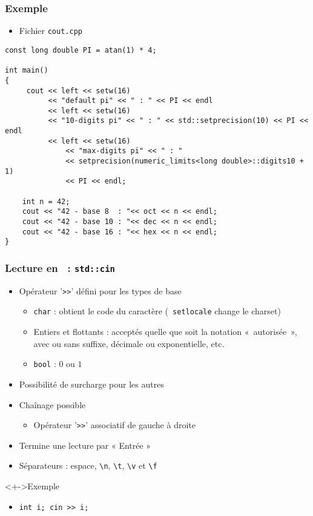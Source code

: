 \begin{frame}[containsverbatim]
\frametitle{Exemple}
\begin{itemize}
\item Fichier \texttt{cout.cpp}
\end{itemize}
\begin{lstlisting}
const long double PI = atan(1) * 4;

int main()
{
	 cout << left << setw(16)
	      << "default pi" << " : " << PI << endl
	      << left << setw(16) 
	      << "10-digits pi" << " : " << std::setprecision(10) << PI << endl
	      << left << setw(16)
              << "max-digits pi" << " : " 
              << setprecision(numeric_limits<long double>::digits10 + 1)
              << PI << endl;
 
	int n = 42;
	cout << "42 - base 8  : "<< oct << n << endl;
	cout << "42 - base 10 : "<< dec << n << endl;
	cout << "42 - base 16 : "<< hex << n << endl;                  
}
\end{lstlisting}
\end{frame}

\begin{frame}
\frametitle{Lecture en \cpp\ : \texttt{std::cin}}
\begin{itemize}[<+->]
\item Opérateur '\texttt{>>}' défini pour les types de base
	\begin{itemize}
	\item \lstinline|char| : obtient le code du caractère (\texttt{	setlocale} change le charset)
	\item Entiers et flottants : acceptés quelle que soit la notation «~autorisée~», avec ou sans suffixe, décimale ou exponentielle, etc.
	\item \lstinline|bool| : $0$ ou $1$
	\end{itemize}
\item Possibilité de surcharge pour les autres
\item Chaînage possible
	\begin{itemize}
	\item Opérateur '\texttt{>>}' associatif de gauche à droite
	\end{itemize}
\item Termine une lecture par « Entrée »
\item Séparateurs : espace, \texttt{\textbackslash{}n}, \texttt{\textbackslash{}t}, \texttt{\textbackslash{}v} et \texttt{\textbackslash{}f}
\end{itemize}
\begin{exampleblock}<+->{Exemple}
	\begin{itemize}[<+->]
	\item \lstinline|int i; cin >> i;|
	\end{itemize}
\end{exampleblock}
\end{frame}

